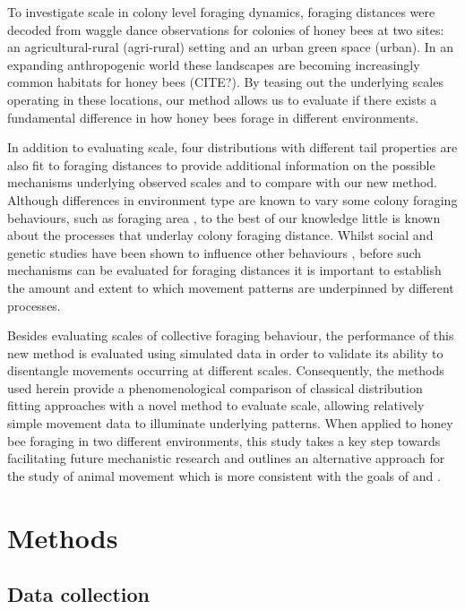 \documentclass[11pt,usenames,dvipsnames,a4paper]{article}
\begin{document}
\begin{linenumbers}
To investigate scale in colony level foraging dynamics, foraging distances were decoded from waggle dance observations for colonies of honey bees at two sites: an agricultural-rural (agri-rural) setting and an urban green space (urban). In an expanding anthropogenic world these landscapes are becoming increasingly common habitats for honey bees (CITE?). By teasing out the underlying scales operating in these locations, our method allows us to evaluate if there exists a fundamental difference in how honey bees forage in different environments. 

In addition to evaluating scale, four distributions with different tail properties are also fit to foraging distances to provide additional information on the possible mechanisms underlying observed scales and to compare with our new method. Although differences in environment type are known to vary some colony foraging behaviours, such as foraging area \citep{Lecocq2015, Samuelson2018}, to the best of our knowledge little is known about the processes that underlay colony foraging distance. Whilst social and genetic studies have been shown to influence other behaviours \citep{Fewell1993, Page1998, Sherman2002, Jones2004, Gruter2009}, before such mechanisms can be evaluated for foraging distances it is important to establish the amount and extent to which movement patterns are underpinned by different processes.

Besides evaluating scales of collective foraging behaviour, the performance of this new method is evaluated using simulated data in order to validate its ability to disentangle movements occurring at different scales. Consequently, the methods used herein provide a phenomenological comparison of classical distribution fitting approaches with a novel method to evaluate scale, allowing relatively simple movement data to illuminate underlying patterns. When applied to honey bee foraging in two different environments, this study takes a key step towards facilitating future mechanistic research and outlines an alternative approach for the study of animal movement which is more consistent with the goals of \cite{Nathan2008} and \cite{Patterson2017}.
\end{linenumbers}
	
\section{Methods}

\subsection{Data collection}
\end{document}
